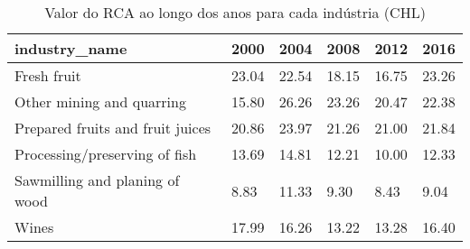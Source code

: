 \begin{table}
\centering
\caption{Valor do RCA ao longo dos anos para cada indústria (CHL)}
\begin{tabular}{p{6cm}p{1.5cm}p{1.5cm}p{1.5cm}p{1.5cm}p{1.5cm}}
\toprule
                   industry\_name &  2000 &  2004 &  2008 &  2012 &  2016 \\
\midrule
                     Fresh fruit & 23.04 & 22.54 & 18.15 & 16.75 & 23.26 \\
       Other mining and quarring & 15.80 & 26.26 & 23.26 & 20.47 & 22.38 \\
Prepared fruits and fruit juices & 20.86 & 23.97 & 21.26 & 21.00 & 21.84 \\
   Processing/preserving of fish & 13.69 & 14.81 & 12.21 & 10.00 & 12.33 \\
  Sawmilling and planing of wood &  8.83 & 11.33 &  9.30 &  8.43 &  9.04 \\
                           Wines & 17.99 & 16.26 & 13.22 & 13.28 & 16.40 \\
\bottomrule
\end{tabular}
\end{table}
